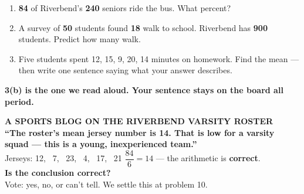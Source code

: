 \documentclass[aspectratio=169, 11pt]{beamer}
\begin{document}
\begin{frame}[t, plain]
  \vspace{0.3cm}
  \begin{center}
    \begin{minipage}{0.86\textwidth}
      \begin{enumerate}\setlength{\itemsep}{7pt}
        \item \textbf{84} of Riverbend's \textbf{240} seniors ride the bus. What percent?
        \item A survey of \textbf{50} students found \textbf{18} walk to school. Riverbend has
              \textbf{900} students. Predict how many walk.
        \item Five students spent 12, 15, 9, 20, 14 minutes on homework. Find the mean ---
              then write one sentence saying what your answer describes.
      \end{enumerate}
    \end{minipage}
  \end{center}
  \vspace{0.4cm}
  \begin{center}
    {\color{cerulean}\bfseries 3(b) is the one we read aloud. Your sentence stays on the board
    all period.}
  \end{center}
\end{frame}

{
\begin{frame}[plain]
  \vspace{1.1cm}
  \begin{center}
    {\color{frostmid}\bfseries\small A SPORTS BLOG ON THE RIVERBEND VARSITY ROSTER}\\[0.7cm]
    {\color{white}\bfseries\large ``The roster's mean jersey number is 14. That is low for a
    varsity squad --- this is a young, inexperienced team.''}\\[0.8cm]
    {\color{white}\small Jerseys: 12, \ 7, \ 23, \ 4, \ 17, \ 21 \qquad
    $\dfrac{84}{6} = 14$ \quad --- the arithmetic is \textbf{correct}.}\\[0.8cm]
    {\color{goldacc}\bfseries\large Is the conclusion correct?}\\[0.5cm]
    {\color{frostmid}\small Vote: yes, no, or can't tell. We settle this at problem 10.}
  \end{center}
\end{frame}
}
\end{document}
